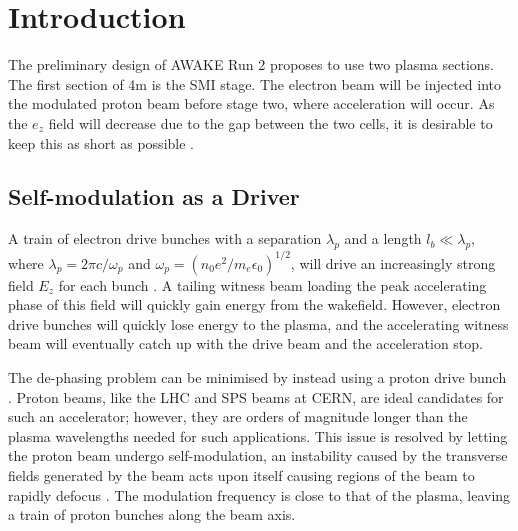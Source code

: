 \documentclass[aps,prstab,reprint,amsmath,amssymb,groupedaddress]{revtex4-1}
\begin{document}
\section[\label{S:I}]{Introduction}

The preliminary design of AWAKE Run 2 proposes to use two plasma sections. The first section of 4m is the SMI stage. The
electron beam will be injected into the modulated proton beam before stage two, where acceleration will occur. As the
$e_z$ field will decrease due to the gap between the two cells, it is desirable to keep this as short as possible
\cite{adli:2016}.

\subsection[\label{S:I:SMI}]{Self-modulation as a Driver}

A train of electron drive bunches with a separation $\lambda_{p}$ and a length $l_{b} \ll \lambda_{p}$, where
$\lambda_{p} = 2\pi c/\omega_{p}$ and $\omega_{p} = (n_{0} e^{2} / m_{e} \epsilon_{0})^{1/2}$, will drive an
increasingly strong field $E_{z}$ for each bunch \cite{chen:1985}. A tailing witness beam loading the peak accelerating
phase of this field will quickly gain energy from the wakefield. However, electron drive bunches will quickly lose
energy to the plasma, and the accelerating witness beam will eventually catch up with the drive beam and the
acceleration stop.

The de-phasing problem can be minimised by instead using a proton drive bunch \cite{caldwell:2009}. Proton beams, like
the LHC and SPS beams at CERN, are ideal candidates for such an accelerator; however, they are orders of magnitude
longer than the plasma wavelengths needed for such applications. This issue is resolved by letting the proton beam
undergo self-modulation, an instability caused by the transverse fields generated by the beam acts upon itself causing
regions of the beam to rapidly defocus \cite{kumar:2010}. The modulation frequency is close to that of the plasma,
leaving a train of proton bunches along the beam axis.
\end{document}
